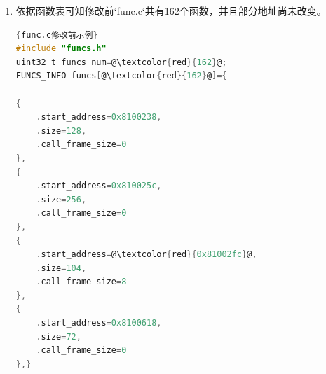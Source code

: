 \documentclass[UTF8,12pt,a4paper,twoside]{ctexart}
\numberwithin{figure}{section}
\begin{document}
\begin{enumerate}
\begin{enumerate}
\begin{figure}
                        \label{gl}
                    \end{figure}
              \item 依据函数表可知修改前`func.c`共有162个函数，并且部分地址尚未改变。
                    \begin{lstlisting}[language=C]{func.c修改前示例}
#include "funcs.h"
uint32_t funcs_num=@\textcolor{red}{162}@;
FUNCS_INFO funcs[@\textcolor{red}{162}@]={

{
    .start_address=0x8100238,
    .size=128,
    .call_frame_size=0
},
{
    .start_address=0x810025c,
    .size=256,
    .call_frame_size=0
},
{
    .start_address=@\textcolor{red}{0x81002fc}@,
    .size=104,
    .call_frame_size=8
},
{
    .start_address=0x8100618,
    .size=72,
    .call_frame_size=0
},} \end{lstlisting}
                    

\end{enumerate}
\end{enumerate}
\end{document}
